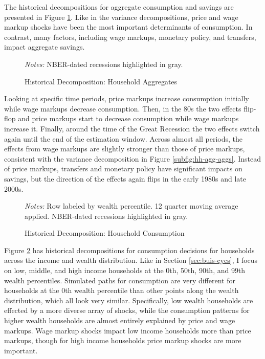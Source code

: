The historical decompositions for aggregate consumption and savings are presented in Figure \ref{fig:agg-hist-decomp}. Like in the variance decompositions, price and wage markup shocks have been the most important determinants of consumption. In contrast, many factors, including wage markups, monetary policy, and transfers, impact aggregate savings.

\begin{figure}[t]
    \centering
    \caption{Historical Decomposition: Household Aggregates}
    

    {\scriptsize \emph{Notes:} NBER-dated recessions highlighted in gray.}
    \label{fig:agg-hist-decomp}
\end{figure}

Looking at specific time periods, price markups increase consumption initially while wage markups decrease consumption. Then, in the 80s the two effects flip-flop and price markups start to decrease consumption while wage markups increase it. Finally, around the time of the Great Recession the two effects switch again until the end of the estimation window. Across almost all periods, the effects from wage markups are slightly stronger than those of price markups, consistent with the variance decomposition in Figure \ref{subfig:hh-agg-aggs}. Instead of price markups, transfers and monetary policy have significant impacts on savings, but the direction of the effects again flips in the early 1980s and late 2000s.

\begin{figure}[t!]
    \centering
    \caption{Historical Decomposition: Household Consumption}
    
    {\scriptsize \emph{Notes:} Row labeled by wealth percentile. 12 quarter moving average applied. NBER-dated recessions highlighted in gray.}
    \label{fig:cons-hist-decomp}
\end{figure}

Figure \ref{fig:cons-hist-decomp} has historical decompositions for consumption decisions for households across the income and wealth distribution. Like in Section \ref{sec:buis-cycs}, I focus on low, middle, and high income households at the 0th, 50th, 90th, and 99th wealth percentiles. Simulated paths for consumption are very different for households at the 0th wealth percentile than other points along the wealth distribution, which all look very similar. Specifically, low wealth households are effected by a more diverse array of shocks, while the consumption patterns for higher wealth households are almost entirely explained by price and wage markups. Wage markup shocks impact low income households more than price markups, though for high income households price markup shocks are more important.

